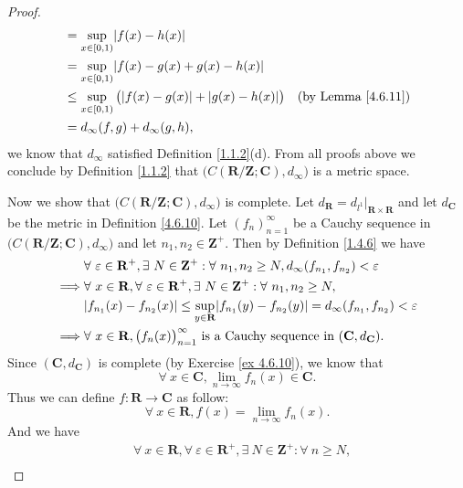 \begin{proof}
\begin{align*}
         & = \sup_{x \in [0, 1)} \abs*{f(x) - h(x)}                                                                      \\
         & = \sup_{x \in [0, 1)} \abs*{f(x) - g(x) + g(x) - h(x)}                                                        \\
         & \leq \sup_{x \in [0, 1)} \big(\abs*{f(x) - g(x)} + \abs*{g(x) - h(x)}\big)   & \text{(by Lemma \ref{4.6.11})} \\
         & = d_\infty(f, g) + d_\infty(g, h),
    \end{align*}
    we know that \(d_\infty\) satisfied Definition \ref{1.1.2}(d).
    From all proofs above we conclude by Definition \ref{1.1.2} that \(\big(C(\mathbf{R} / \mathbf{Z} ; \mathbf{C}), d_\infty\big)\) is a metric space.

    Now we show that \(\big(C(\mathbf{R} / \mathbf{Z} ; \mathbf{C}), d_\infty\big)\) is complete.
    Let \(d_{\mathbf{R}} = d_{l^1}|_{\mathbf{R} \times \mathbf{R}}\) and let \(d_{\mathbf{C}}\) be the metric in Definition \ref{4.6.10}.
    Let \((f_n)_{n = 1}^\infty\) be a Cauchy sequence in \(\big(C(\mathbf{R} / \mathbf{Z} ; \mathbf{C}), d_\infty\big)\) and let \(n_1, n_2 \in \mathbf{Z}^+\).
    Then by Definition \ref{1.4.6} we have
    \begin{align*}
                 & \forall\ \varepsilon \in \mathbf{R}^+, \exists\ N \in \mathbf{Z}^+ : \forall\ n_1, n_2 \geq N, d_\infty(f_{n_1}, f_{n_2}) < \varepsilon \\
        \implies & \forall\ x \in \mathbf{R}, \forall\ \varepsilon \in \mathbf{R}^+, \exists\ N \in \mathbf{Z}^+ : \forall\ n_1, n_2 \geq N,               \\
                 & \abs*{f_{n_1}(x) - f_{n_2}(x)} \leq \sup_{y \in \mathbf{R}} \abs*{f_{n_1}(y) - f_{n_2}(y)} = d_\infty(f_{n_1}, f_{n_2}) < \varepsilon   \\
        \implies & \forall\ x \in \mathbf{R}, \big(f_n(x)\big)_{n = 1}^\infty \text{ is a Cauchy sequence in } (\mathbf{C}, d_{\mathbf{C}}).
    \end{align*}
    Since \((\mathbf{C}, d_{\mathbf{C}})\) is complete (by Exercise \ref{ex 4.6.10}), we know that
    \[
        \forall\ x \in \mathbf{C}, \lim_{n \to \infty} f_n(x) \in \mathbf{C}.
    \]
    Thus we can define \(f : \mathbf{R} \to \mathbf{C}\) as follow:
    \[
        \forall\ x \in \mathbf{R}, f(x) = \lim_{n \to \infty} f_n(x).
    \]
    And we have
    \begin{align*}
                 & \forall\ x \in \mathbf{R}, \forall\ \varepsilon \in \mathbf{R}^+, \exists\ N \in \mathbf{Z}^+ : \forall\ n \geq N,                                                     \\

\end{align*}
\end{proof}
